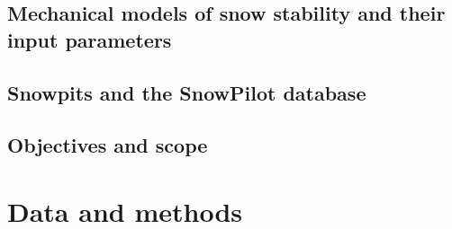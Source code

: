 \documentclass[hess, manuscript]{copernicus}
\begin{document}
\subsection{Mechanical models of snow stability and their input parameters}




\subsection{Snowpits and the SnowPilot database}




\FloatBarrier

\subsection{Objectives and scope}








\section{Data and methods}
\end{document}

